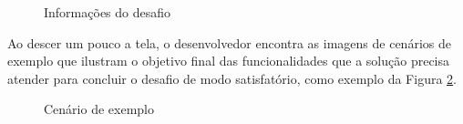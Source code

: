 \documentclass[english,brazilian]{UNISINOSartigo} %
\begin{document}
\begin{figure}[ht]
    \caption{Informações do desafio}
    \label{fig:informacoes_desafio}
    \centering
    \footnotesize
    \begin{minipage}{.9\textwidth}
        \centering
    \end{minipage}
\end{figure}
\FloatBarrier

Ao descer um pouco a tela, o desenvolvedor encontra as imagens de cenários de exemplo que ilustram o objetivo final das funcionalidades que a solução precisa atender para concluir o desafio de modo satisfatório, como exemplo da Figura \ref{fig:exemplos_desafio}.

\begin{figure}[ht]
    \caption{Cenário de exemplo}
    \label{fig:exemplos_desafio}
    \centering
    \footnotesize
    \begin{minipage}{.9\textwidth}
        \centering
    \end{minipage}
\end{figure}
\FloatBarrier
\end{document}

